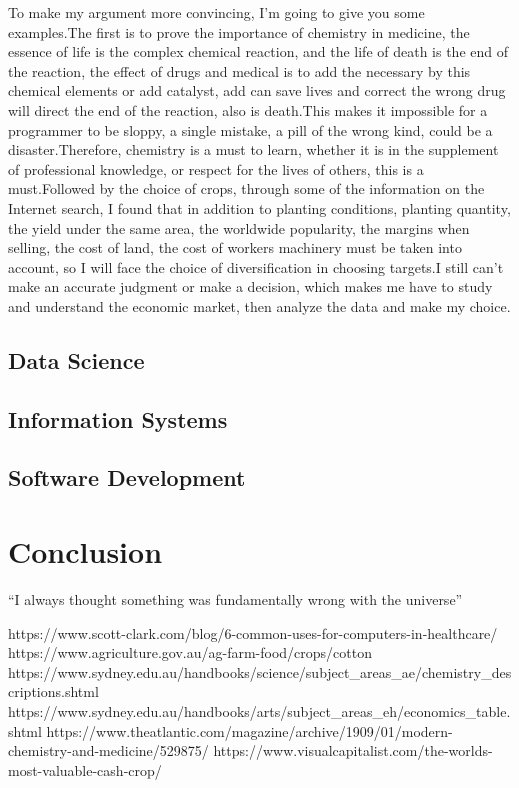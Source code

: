 \documentclass{article}
\begin{document}
To make my argument more convincing, I'm going to give you some examples.The first is to prove the importance of chemistry in medicine, the essence of life is the complex chemical reaction, and the life of death is the end of the reaction, the effect of drugs and medical is to add the necessary by this chemical elements or add catalyst, add can save lives and correct the wrong drug will direct the end of the reaction, also is death.This makes it impossible for a programmer to be sloppy, a single mistake, a pill of the wrong kind, could be a disaster.Therefore, chemistry is a must to learn, whether it is in the supplement of professional knowledge, or respect for the lives of others, this is a must.Followed by the choice of crops, through some of the information on the Internet search, I found that in addition to planting conditions, planting quantity, the yield under the same area, the worldwide popularity, the margins when selling, the cost of land, the cost of workers machinery must be taken into account, so I will face the choice of diversification in choosing targets.I still can't make an accurate judgment or make a decision, which makes me have to study and understand the economic market, then analyze the data and make my choice.


\subsection{Data Science}


\subsection{Information Systems}


\subsection{Software Development}

\section{Conclusion}
``I always thought something was fundamentally wrong with the universe'' \citep{adams1995hitchhiker}




https://www.scott-clark.com/blog/6-common-uses-for-computers-in-healthcare/
https://www.agriculture.gov.au/ag-farm-food/crops/cotton
https://www.sydney.edu.au/handbooks/science/subject_areas_ae/chemistry_descriptions.shtml
https://www.sydney.edu.au/handbooks/arts/subject_areas_eh/economics_table.shtml
https://www.theatlantic.com/magazine/archive/1909/01/modern-chemistry-and-medicine/529875/
https://www.visualcapitalist.com/the-worlds-most-valuable-cash-crop/
\end{document}
